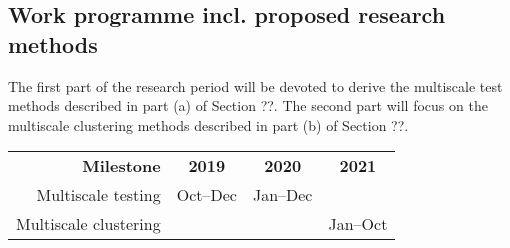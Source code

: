 \documentclass[a4paper,12pt]{article}
\begin{document}


\subsection{Work programme incl. proposed research methods}


The first part of the research period will be devoted to derive the multiscale test methods described in part (a) of Section ??. The second part will focus on the multiscale clustering methods described in part (b) of Section ??. 

\begin{center}
\begin{tabular}{r c c c}
{\bf Milestone} & {\bf 2019} & {\bf 2020} & {\bf 2021} \\
Multiscale testing & Oct--Dec & Jan--Dec & \\
Multiscale clustering & & & Jan--Oct
\end{tabular}
\end{center}




\end{document}
